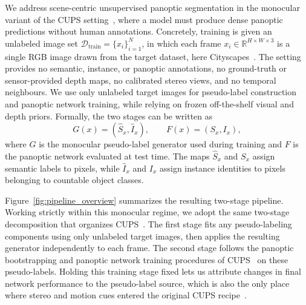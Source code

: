 \documentclass[10pt,twocolumn,letterpaper]{article}
\begin{document}
We address scene-centric unsupervised panoptic segmentation in the monocular variant of the CUPS setting~\cite{hahn2025cups}, where a model must produce dense panoptic predictions without human annotations. Concretely, training is given an unlabeled image set $\mathcal{D}_{\text{train}} = \{x_i\}_{i=1}^{N}$, in which each frame $x_i \in \mathbb{R}^{H \times W \times 3}$ is a single RGB image drawn from the target dataset, here Cityscapes~\cite{cordts2016cityscapes}. The setting provides no semantic, instance, or panoptic annotations, no ground-truth or sensor-provided depth maps, no calibrated stereo views, and no temporal neighbours. We use only unlabeled target images for pseudo-label construction and panoptic network training, while relying on frozen off-the-shelf visual and depth priors. Formally, the two stages can be written as
\begin{equation}
G(x) = (\hat S_x, \hat I_x), \qquad F(x) = (S_x, I_x),
\label{eq:pipeline}
\end{equation}
where $G$ is the monocular pseudo-label generator used during training and $F$ is the panoptic network evaluated at test time. The maps $\hat S_x$ and $S_x$ assign semantic labels to pixels, while $\hat I_x$ and $I_x$ assign instance identities to pixels belonging to countable object classes.

Figure~\ref{fig:pipeline_overview} summarizes the resulting two-stage pipeline. Working strictly within this monocular regime, we adopt the same two-stage decomposition that organizes CUPS~\cite{hahn2025cups}. The first stage fits any pseudo-labeling components using only unlabeled target images, then applies the resulting generator independently to each frame. The second stage follows the panoptic bootstrapping and panoptic network training procedures of CUPS~\cite{hahn2025cups} on these pseudo-labels. Holding this training stage fixed lets us attribute changes in final network performance to the pseudo-label source, which is also the only place where stereo and motion cues entered the original CUPS recipe~\cite{hahn2025cups}.
\end{document}
